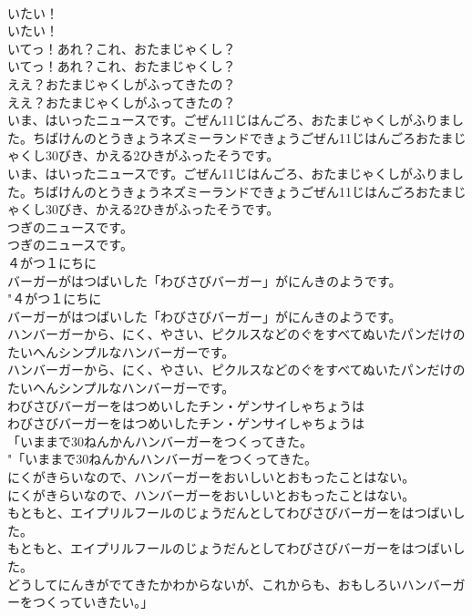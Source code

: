 \documentclass[8pt]{extreport}
\begin{document}
\begin{CJK}{UTF8}{min}
\\	いたい！	
\\	いたい！ 
\\	いてっ！あれ？これ、おたまじゃくし？	
\\	いてっ！あれ？これ、おたまじゃくし？ 
\\	ええ？おたまじゃくしがふってきたの？	
\\	ええ？おたまじゃくしがふってきたの？ 
\\	いま、はいったニュースです。ごぜん11じはんごろ、おたまじゃくしがふりました。ちばけんのとうきょうネズミーランドできょうごぜん11じはんごろおたまじゃくし30びき、かえる2ひきがふったそうです。	
\\	いま、はいったニュースです。ごぜん11じはんごろ、おたまじゃくしがふりました。ちばけんのとうきょうネズミーランドできょうごぜん11じはんごろおたまじゃくし30びき、かえる2ひきがふったそうです。 
\\	つぎのニュースです。	
\\	つぎのニュースです。 
\\	４がつ１にちに
\\	バーガーがはつばいした「わびさびバーガー」がにんきのようです。	
\\	"４がつ１にちに
\\	バーガーがはつばいした「わびさびバーガー」がにんきのようです。 
\\	ハンバーガーから、にく、やさい、ピクルスなどのぐをすべてぬいたパンだけのたいへんシンプルなハンバーガーです。	
\\	ハンバーガーから、にく、やさい、ピクルスなどのぐをすべてぬいたパンだけのたいへんシンプルなハンバーガーです。 
\\	わびさびバーガーをはつめいしたチン・ゲンサイしゃちょうは	
\\	わびさびバーガーをはつめいしたチン・ゲンサイしゃちょうは 
\\	「いままで30ねんかんハンバーガーをつくってきた。	
\\	"「いままで30ねんかんハンバーガーをつくってきた。 
\\	にくがきらいなので、ハンバーガーをおいしいとおもったことはない。	
\\	にくがきらいなので、ハンバーガーをおいしいとおもったことはない。 
\\	もともと、エイプリルフールのじょうだんとしてわびさびバーガーをはつばいした。	
\\	もともと、エイプリルフールのじょうだんとしてわびさびバーガーをはつばいした。 
\\	どうしてにんきがでてきたかわからないが、これからも、おもしろいハンバーガーをつくっていきたい。」	

\end{CJK}
\end{document}
